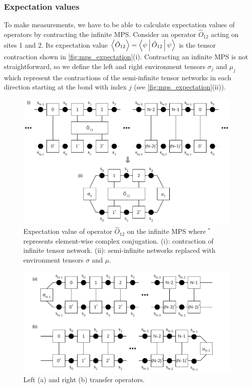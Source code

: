 \documentclass[a4paper, headsepline, footheight=13.6pt]{scrartcl}
\begin{document}
\subsubsection{Expectation values}
To make measurements, we have to be able to calculate expectation values of operators by contracting the infinite MPS. Consider an operator $\hat{O}_{12}$ acting on sites 1 and 2. Its expectation value $\Braket{\hat{O}_{12}} = \Braket{\psi | \hat{O}_{12} | \psi}$ is the tensor contraction shown in \autoref{fig:mps_expectation}(i). Contracting an infinite MPS is not straightforward, so we define the left and right environment tensors $\sigma_j$ and $\mu_j$ which represent the contractions of the semi-infinite tensor networks in each direction starting at the bond with index $j$ (see \autoref{fig:mps_expectation}(ii)).

\begin{figure}[htbp]
    \centering
    \includegraphics[width=\textwidth]{figures/mps_expectation.pdf}
    \caption{Expectation value of operator $\hat{O}_{12}$ on the infinite MPS where $^*$ represents element-wise complex conjugation. {(i):} contraction of infinite tensor network. {(ii):} semi-infinite networks replaced with environment tensors $\sigma$ and $\mu$.}
    \label{fig:mps_expectation}
\end{figure}

\begin{figure}[htbp]
    \centering
    \includegraphics[width=\textwidth]{figures/transfer_operators.pdf}
    \caption{Left {(a)} and right {(b)} transfer operators.}
    \label{fig:transfer_operators}
\end{figure}
\end{document}
